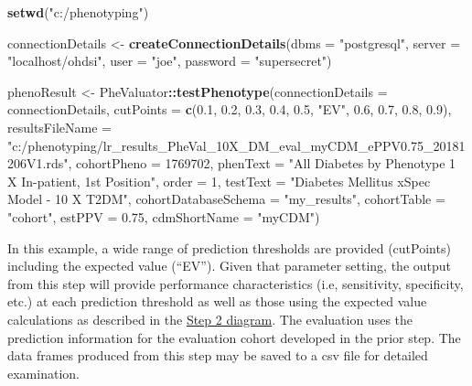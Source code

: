 \documentclass[]{article}
\newenvironment{Shaded}{\begin{snugshade}}{\end{snugshade}}
\newcommand{\DataTypeTok}[1]{\textcolor[rgb]{0.13,0.29,0.53}{#1}}
\newcommand{\DecValTok}[1]{\textcolor[rgb]{0.00,0.00,0.81}{#1}}
\newcommand{\FloatTok}[1]{\textcolor[rgb]{0.00,0.00,0.81}{#1}}
\newcommand{\KeywordTok}[1]{\textcolor[rgb]{0.13,0.29,0.53}{\textbf{#1}}}
\newcommand{\NormalTok}[1]{#1}
\newcommand{\OperatorTok}[1]{\textcolor[rgb]{0.81,0.36,0.00}{\textbf{#1}}}
\newcommand{\StringTok}[1]{\textcolor[rgb]{0.31,0.60,0.02}{#1}}
\begin{document}
\begin{Shaded}
\begin{Highlighting}[]
\KeywordTok{setwd}\NormalTok{(}\StringTok{"c:/phenotyping"}\NormalTok{)}

\NormalTok{connectionDetails <-}\StringTok{ }\KeywordTok{createConnectionDetails}\NormalTok{(}\DataTypeTok{dbms =} \StringTok{"postgresql"}\NormalTok{,}
                                              \DataTypeTok{server =} \StringTok{"localhost/ohdsi"}\NormalTok{,}
                                              \DataTypeTok{user =} \StringTok{"joe"}\NormalTok{,}
                                              \DataTypeTok{password =} \StringTok{"supersecret"}\NormalTok{)}

\NormalTok{phenoResult <-}\StringTok{ }\NormalTok{PheValuator}\OperatorTok{::}\KeywordTok{testPhenotype}\NormalTok{(}\DataTypeTok{connectionDetails =}\NormalTok{ connectionDetails,}
               \DataTypeTok{cutPoints =} \KeywordTok{c}\NormalTok{(}\FloatTok{0.1}\NormalTok{, }\FloatTok{0.2}\NormalTok{, }\FloatTok{0.3}\NormalTok{, }\FloatTok{0.4}\NormalTok{, }\FloatTok{0.5}\NormalTok{, }\StringTok{"EV"}\NormalTok{, }\FloatTok{0.6}\NormalTok{, }\FloatTok{0.7}\NormalTok{, }\FloatTok{0.8}\NormalTok{, }\FloatTok{0.9}\NormalTok{),}
               \DataTypeTok{resultsFileName =} \StringTok{"c:/phenotyping/lr_results_PheVal_10X_DM_eval_myCDM_ePPV0.75_20181206V1.rds"}\NormalTok{,}
               \DataTypeTok{cohortPheno =} \DecValTok{1769702}\NormalTok{,}
               \DataTypeTok{phenText =} \StringTok{"All Diabetes by Phenotype 1 X In-patient, 1st Position"}\NormalTok{,}
               \DataTypeTok{order =} \DecValTok{1}\NormalTok{,}
               \DataTypeTok{testText =} \StringTok{"Diabetes Mellitus xSpec Model - 10 X T2DM"}\NormalTok{,}
               \DataTypeTok{cohortDatabaseSchema =} \StringTok{"my_results"}\NormalTok{,}
               \DataTypeTok{cohortTable =} \StringTok{"cohort"}\NormalTok{,}
               \DataTypeTok{estPPV =} \FloatTok{0.75}\NormalTok{, }
               \DataTypeTok{cdmShortName =} \StringTok{"myCDM"}\NormalTok{)}
\end{Highlighting}
\end{Shaded}

In this example, a wide range of prediction thresholds are provided
(cutPoints) including the expected value (``EV''). Given that parameter
setting, the output from this step will provide performance
characteristics (i.e, sensitivity, specificity, etc.) at each prediction
threshold as well as those using the expected value calculations as
described in the \href{vignettes/Figure2.png}{Step 2 diagram}. The
evaluation uses the prediction information for the evaluation cohort
developed in the prior step. The data frames produced from this step may
be saved to a csv file for detailed examination.
\end{document}
